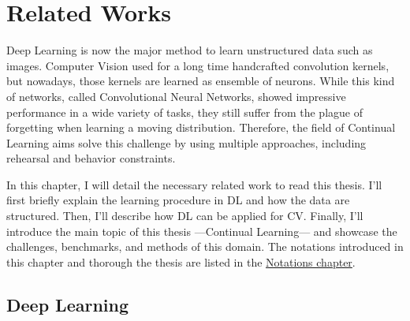 \chapter{Related Works}
\label{chapter:related}

\begin{chapabstract}
      Deep Learning is now the major method to learn unstructured data such as images. Computer
      Vision used for a long time handcrafted convolution kernels, but nowadays, those kernels are
      learned as ensemble of neurons. While this kind of networks, called Convolutional Neural
      Networks, showed impressive performance in a wide variety of tasks, they still suffer from
      the plague of forgetting when learning a moving distribution. Therefore, the field of
      Continual Learning aims solve this challenge by using multiple approaches, including rehearsal
      and behavior constraints.
\end{chapabstract}

{}



In this chapter, I will detail the necessary related work to read this thesis. I'll first briefly
explain the learning procedure in \acf{DL} and how the data are structured. Then, I'll describe how
\ac{DL} can be applied for \acf{CV}. Finally, I'll introduce the main topic of this thesis
---Continual Learning--- and showcase the challenges, benchmarks, and methods of this domain. The
notations introduced in this chapter and thorough the thesis are listed in the
\hyperref[chap:notations]{Notations chapter}.

\section{Deep Learning}

